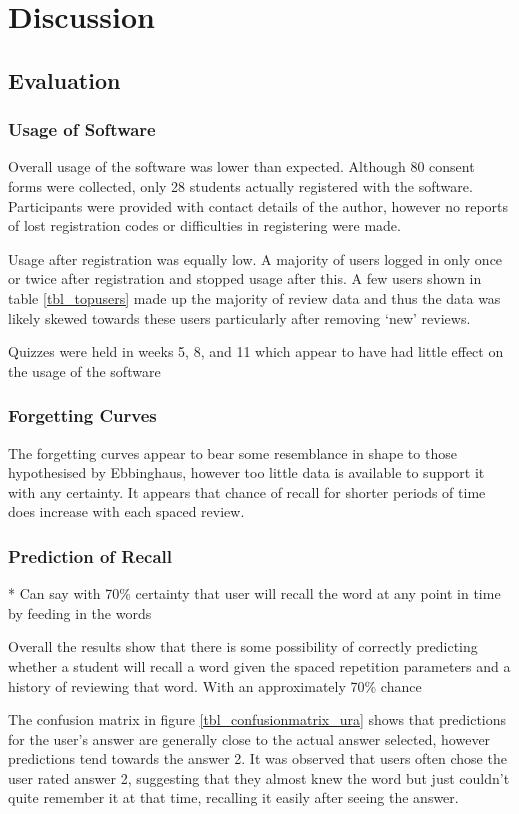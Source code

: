 \chapter{Discussion}


\section{Evaluation}
\subsection{Usage of Software}
Overall usage of the software was lower than expected. Although 80 consent forms were
collected, only 28 students actually registered with the software. Participants were
provided with contact details of the author, however no reports of lost registration
codes or difficulties in registering were made.

Usage after registration was equally low. A majority of users logged in only once or twice
after registration and stopped usage after this. A few users shown in table \ref{tbl_topusers}
made up the majority of review data and thus the data was likely skewed towards these users
particularly after removing `new' reviews.

Quizzes were held in weeks 5, 8, and 11 which appear to have had little effect on the
usage of the software

\subsection{Forgetting Curves}
The forgetting curves appear to bear some resemblance in shape to those hypothesised
by Ebbinghaus, however too little data is available to support it with any certainty.
It appears that chance of recall for shorter periods of time does increase with each
spaced review.

\subsection{Prediction of Recall}
* Can say with 70\% certainty that user will recall the word at any point in time
by feeding in the words

Overall the results show that there is some possibility of correctly predicting whether
a student will recall a word given the spaced repetition parameters and a history of
reviewing that word. With an approximately 70\% chance

The confusion matrix in figure \ref{tbl_confusionmatrix_ura} shows that predictions
for the user's answer are generally close to the actual answer selected, however
predictions tend towards the answer 2. It was observed that users often chose the
user rated answer 2, suggesting that they almost knew the word but just couldn't quite remember it at
that time, recalling it easily after seeing the answer.

